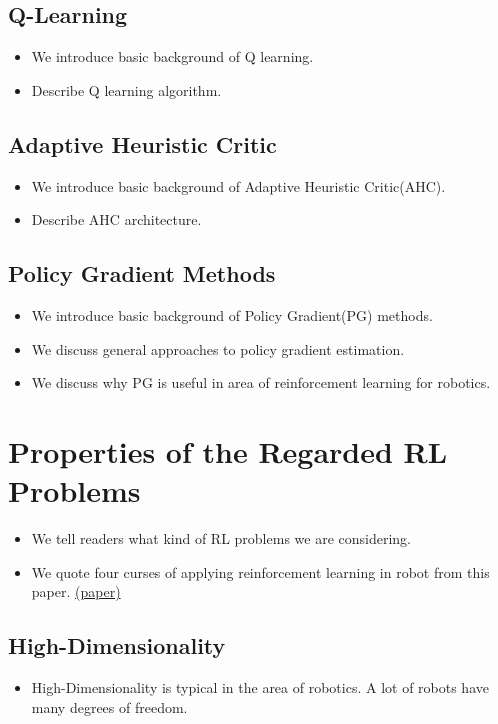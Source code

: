\documentclass[officiallayout]{tktla}
\begin{document}
\subsection{Q-Learning}
\begin{itemize}
\item We introduce basic background of Q learning.
\item Describe Q learning algorithm.
\end{itemize}

\subsection{Adaptive Heuristic Critic}
\begin{itemize}
\item We introduce basic background of Adaptive Heuristic Critic(AHC).
\item Describe AHC architecture.
\end{itemize}

\subsection{Policy Gradient Methods}
\begin{itemize}
\item We introduce basic background of Policy Gradient(PG) methods.
\item We discuss general approaches to policy gradient estimation.
\item We discuss why PG is useful in area of reinforcement learning for robotics.
\end{itemize}

\section{Properties of the Regarded RL Problems}
\begin{itemize}
\item We tell readers what kind of RL problems we are considering.
\item We quote four curses of applying reinforcement learning in robot from this paper. \href{"http://www.ias.tu-darmstadt.de/uploads/Publications/Kober\_IJRR\_2013.pdf"}{(paper)}
\end{itemize}

\subsection{High-Dimensionality}
\begin{itemize}
\item High-Dimensionality is typical in the area of robotics. A lot of robots have many degrees of freedom.
\end{itemize}
\end{document}
